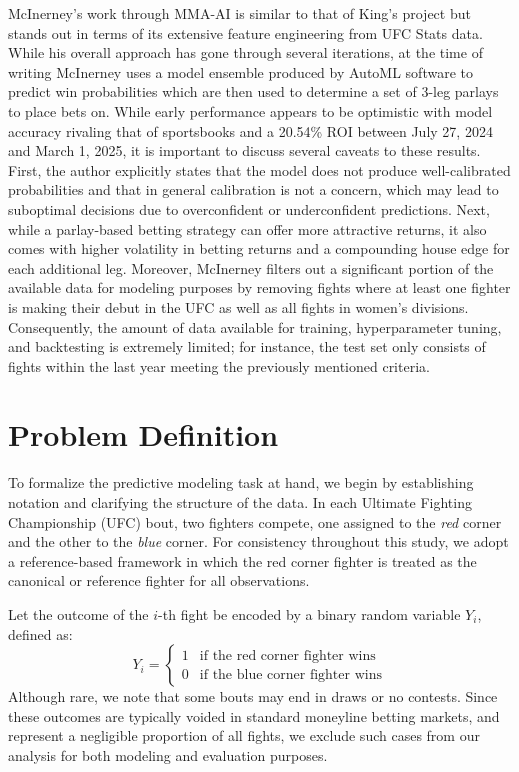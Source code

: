 \documentclass[12pt,twoside]{report}
\begin{document}
McInerney's work through MMA-AI \citep{mcinerney_mmaai} is similar to that of King's project but stands out in terms of its extensive feature engineering from UFC Stats data. While his overall approach has gone through several iterations, at the time of writing McInerney uses a model ensemble produced by AutoML software to predict win probabilities which are then used to determine a set of 3-leg parlays to place bets on. While early performance appears to be optimistic with model accuracy rivaling that of sportsbooks and a 20.54\% ROI between July 27, 2024 and March 1, 2025, it is important to discuss several caveats to these results. First, the author explicitly states that the model does not produce well-calibrated probabilities and that in general calibration is not a concern, which may lead to suboptimal decisions due to overconfident or underconfident predictions. Next, while a parlay-based betting strategy can offer more attractive returns, it also comes with higher volatility in betting returns and a compounding house edge for each additional leg. Moreover, McInerney filters out a significant portion of the available data for modeling purposes by removing fights where at least one fighter is making their debut in the UFC as well as all fights in women's divisions. Consequently, the amount of data available for training, hyperparameter tuning, and backtesting is extremely limited; for instance, the test set only consists of fights within the last year meeting the previously mentioned criteria.


\section{Problem Definition}

To formalize the predictive modeling task at hand, we begin by establishing notation and clarifying the structure of the data. In each Ultimate Fighting Championship (UFC) bout, two fighters compete, one assigned to the \textit{red} corner and the other to the \textit{blue} corner. For consistency throughout this study, we adopt a reference-based framework in which the red corner fighter is treated as the canonical or reference fighter for all observations.

Let the outcome of the $i$-th fight be encoded by a binary random variable $Y_i$, defined as:
$$Y_i = \begin{cases}
    1 & \text{if the red corner fighter wins} \\
    0 & \text{if the blue corner fighter wins}
\end{cases}$$
Although rare, we note that some bouts may end in draws or no contests. Since these outcomes are typically voided in standard moneyline betting markets, and represent a negligible proportion of all fights, we exclude such cases from our analysis for both modeling and evaluation purposes.
\end{document}
